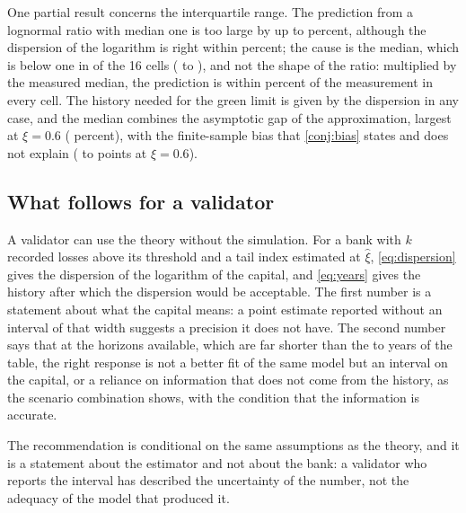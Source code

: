 One partial result concerns the interquartile range. The prediction from a lognormal ratio with median one is too large by up to \thIqrMaxErr{} percent, although the dispersion of the logarithm is right within \thSdMaxErr{} percent; the cause is the median, which is below one in \slBelowCells{} of the 16 cells (\slMedMin{} to \slMedMax{}), and not the shape of the ratio: multiplied by the measured median, the prediction is within \thIqrScaledErr{} percent of the measurement in every cell. The history needed for the green limit is given by the dispersion in any case, and the median combines the asymptotic gap of the approximation, largest at $\xi=0.6$ (\slGapA{} percent), with the finite-sample bias that \cref{conj:bias} states and does not explain (\slBeyondLoA{} to \slBeyondHiA{} points at $\xi=0.6$).

\subsection{What follows for a validator}
\label{sec:disc-implications}

A validator can use the theory without the simulation. For a bank with $k$ recorded losses above its threshold and a tail index estimated at $\hat\xi$, \cref{eq:dispersion} gives the dispersion of the logarithm of the capital, and \cref{eq:years} gives the history after which the dispersion would be acceptable. The first number is a statement about what the capital means: a point estimate reported without an interval of that width suggests a precision it does not have.
The second number says that at the horizons available, which are far shorter than the \yrsMin{} to \yrsMax{} years of the table, the right response is not a better fit of the same model but an interval on the capital, or a reliance on information that does not come from the history, as the scenario combination shows, with the condition that the information is accurate.

The recommendation is conditional on the same assumptions as the theory, and it is a statement about the estimator and not about the bank: a validator who reports the interval has described the uncertainty of the number, not the adequacy of the model that produced it.
